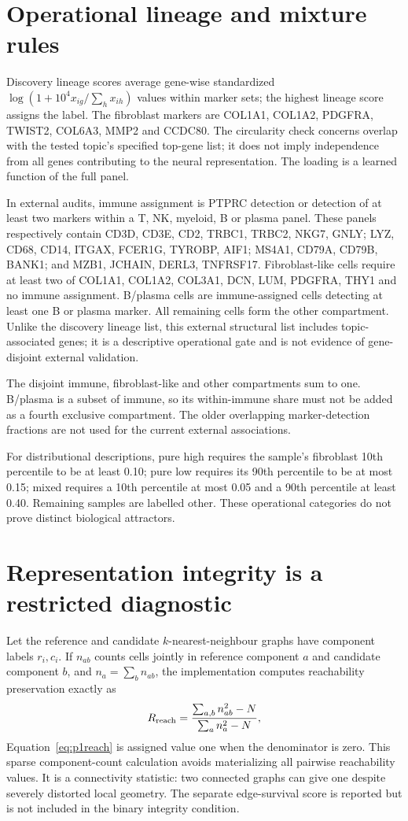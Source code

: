 \section{Operational lineage and mixture rules}
Discovery lineage scores average gene-wise standardized $\log(1+10^4x_{ig}/\sum_hx_{ih})$ values within marker sets; the highest lineage score assigns the label. The fibroblast markers are COL1A1, COL1A2, PDGFRA, TWIST2, COL6A3, MMP2 and CCDC80. The circularity check concerns overlap with the tested topic's specified top-gene list; it does not imply independence from all genes contributing to the neural representation. The loading is a learned function of the full panel.

In external audits, immune assignment is PTPRC detection or detection of at least two markers within a T, NK, myeloid, B or plasma panel. These panels respectively contain CD3D, CD3E, CD2, TRBC1, TRBC2, NKG7, GNLY; LYZ, CD68, CD14, ITGAX, FCER1G, TYROBP, AIF1; MS4A1, CD79A, CD79B, BANK1; and MZB1, JCHAIN, DERL3, TNFRSF17. Fibroblast-like cells require at least two of COL1A1, COL1A2, COL3A1, DCN, LUM, PDGFRA, THY1 and no immune assignment. B/plasma cells are immune-assigned cells detecting at least one B or plasma marker. All remaining cells form the other compartment. Unlike the discovery lineage list, this external structural list includes topic-associated genes; it is a descriptive operational gate and is not evidence of gene-disjoint external validation.

The disjoint immune, fibroblast-like and other compartments sum to one. B/plasma is a subset of immune, so its within-immune share must not be added as a fourth exclusive compartment. The older overlapping marker-detection fractions are not used for the current external associations.

For distributional descriptions, pure high requires the sample's fibroblast 10th percentile to be at least 0.10; pure low requires its 90th percentile to be at most 0.15; mixed requires a 10th percentile at most 0.05 and a 90th percentile at least 0.40. Remaining samples are labelled other. These operational categories do not prove distinct biological attractors.

\section{Representation integrity is a restricted diagnostic}
Let the reference and candidate $k$-nearest-neighbour graphs have component labels $r_i,c_i$. If $n_{ab}$ counts cells jointly in reference component $a$ and candidate component $b$, and $n_a=\sum_bn_{ab}$, the implementation computes reachability preservation exactly as
\begin{equation}
R_{\rm reach}=\frac{\sum_{a,b}n_{ab}^2-N}{\sum_an_a^2-N},\label{eq:p1reach}
\end{equation}
Equation~\eqref{eq:p1reach} is assigned value one when the denominator is zero. This sparse component-count calculation avoids materializing all pairwise reachability values. It is a connectivity statistic: two connected graphs can give one despite severely distorted local geometry. The separate edge-survival score is reported but is not included in the binary integrity condition.

